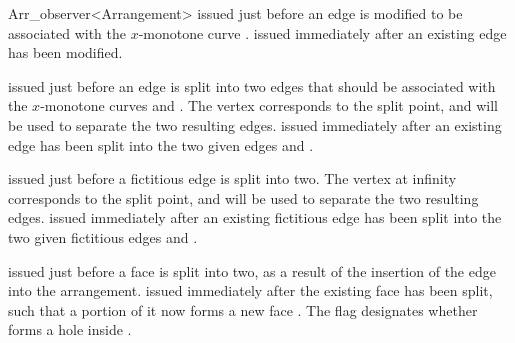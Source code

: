 \begin{ccRefClass}{Arr_observer<Arrangement>}
    {issued just before an edge  is modified to be associated with
     the $x$-monotone curve .}
\ccGlue
{}
    {issued immediately after an existing edge  has been modified.}

    {issued just before an edge  is split into two edges that should
     be associated with the $x$-monotone curves  and . The
     vertex  corresponds to the split point, and will be used to
     separate the two resulting edges.}
\ccGlue
{}
    {issued immediately after an existing edge has been split into the two
     given edges  and .}

    {issued just before a fictitious edge  is split into two. The
     vertex at infinity  corresponds to the split point, and will be
     used to separate the two resulting edges.}
\ccGlue
{}
    {issued immediately after an existing fictitious edge has been split into
     the two given fictitious edges  and .}

    {issued just before a face  is split into two, as a result of
     the insertion of the edge  into the arrangement.}
\ccGlue
{}
    {issued immediately after the existing face  has been split,
     such that a portion of it now forms a new face . The flag
      designates whether  forms a hole inside .}


\end{ccRefClass}
